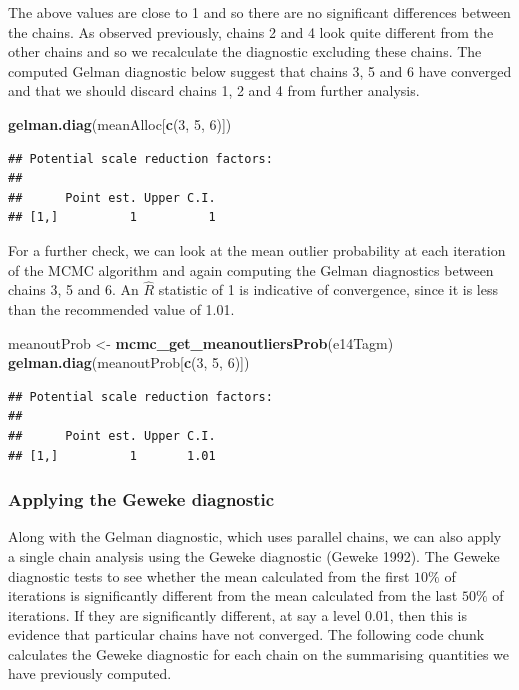 \documentclass[
]{article}
\newenvironment{Shaded}{\begin{snugshade}}{\end{snugshade}}
\newcommand{\DecValTok}[1]{\textcolor[rgb]{0.00,0.00,0.81}{#1}}
\newcommand{\KeywordTok}[1]{\textcolor[rgb]{0.13,0.29,0.53}{\textbf{#1}}}
\newcommand{\NormalTok}[1]{#1}
\newcommand{\StringTok}[1]{\textcolor[rgb]{0.31,0.60,0.02}{#1}}
\begin{document}
The above values are close to 1 and so there are no significant
differences between the chains. As observed previously, chains 2 and 4
look quite different from the other chains and so we recalculate the
diagnostic excluding these chains. The computed Gelman diagnostic below
suggest that chains 3, 5 and 6 have converged and that we should discard
chains 1, 2 and 4 from further analysis.

\begin{Shaded}
\begin{Highlighting}[]
\KeywordTok{gelman.diag}\NormalTok{(meanAlloc[}\KeywordTok{c}\NormalTok{(}\DecValTok{3}\NormalTok{, }\DecValTok{5}\NormalTok{, }\DecValTok{6}\NormalTok{)])}
\end{Highlighting}
\end{Shaded}

\begin{verbatim}
## Potential scale reduction factors:
## 
##      Point est. Upper C.I.
## [1,]          1          1
\end{verbatim}

For a further check, we can look at the mean outlier probability at each
iteration of the MCMC algorithm and again computing the Gelman
diagnostics between chains 3, 5 and 6. An \(\hat{R}\) statistic of 1 is
indicative of convergence, since it is less than the recommended value
of 1.01.

\begin{Shaded}
\begin{Highlighting}[]
\NormalTok{meanoutProb <-}\StringTok{ }\KeywordTok{mcmc_get_meanoutliersProb}\NormalTok{(e14Tagm)}
\KeywordTok{gelman.diag}\NormalTok{(meanoutProb[}\KeywordTok{c}\NormalTok{(}\DecValTok{3}\NormalTok{, }\DecValTok{5}\NormalTok{, }\DecValTok{6}\NormalTok{)])}
\end{Highlighting}
\end{Shaded}

\begin{verbatim}
## Potential scale reduction factors:
## 
##      Point est. Upper C.I.
## [1,]          1       1.01
\end{verbatim}

\hypertarget{applying-the-geweke-diagnostic}{%
\subsubsection{Applying the Geweke
diagnostic}\label{applying-the-geweke-diagnostic}}

Along with the Gelman diagnostic, which uses parallel chains, we can
also apply a single chain analysis using the Geweke diagnostic (Geweke
1992). The Geweke diagnostic tests to see whether the mean calculated
from the first \(10\%\) of iterations is significantly different from
the mean calculated from the last \(50\%\) of iterations. If they are
significantly different, at say a level 0.01, then this is evidence that
particular chains have not converged. The following code chunk
calculates the Geweke diagnostic for each chain on the summarising
quantities we have previously computed.
\end{document}

